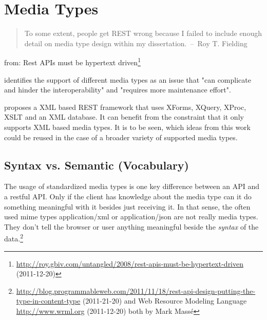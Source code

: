 \documentclass[12pt,a4paper]{scrartcl}		%
\newcommand{\citeurl}[2]{\url{#1} (#2)}
\begin{document}
\section{Media Types}


\begin{quote}
  To some extent, people get REST wrong because I failed to include enough
  detail on media type design within my dissertation.~--~Roy T. Fielding
\end{quote}
from: Rest APIs must be hypertext driven\footnote
  {\citeurl{http://roy.gbiv.com/untangled/2008/rest-apis-must-be-hypertext-driven}{2011-12-20}}

\cite[sec. 7.2]{Pautasso:2008:RWS:1367497.1367606} identifies the support of different media types as an issue that "can complicate and hinder the interoperability" and "requires more maintenance effort".

\cite{Davis:2011:XTR:1967428.1967437} proposes a XML based REST framework that uses XForms, XQuery, XProc, XSLT and an XML database. It can benefit from the constraint that it only supports XML based media types. It is to be seen, which ideas from this work could be reused in the case of a broader variety of supported media types.

\subsection{Syntax vs. Semantic (Vocabulary)}

The usage of standardized media types is one key difference between an API and a
restful API\cite[sec. 5.2.1.2]{Fielding2000}. Only if the client has knowledge
about the media type can it do something meaningful with it besides just
receiving it. In that sense, the often used mime types application/xml or
application/json are not really media types. They don't tell the browser or user
anything meaningful beside the \emph{syntax} of the data.\footnote{
\citeurl{http://blog.programmableweb.com/2011/11/18/rest-api-design-putting-the-type-in-content-type}{2011-21-20}
and Web Resource Modeling Language \citeurl{http://www.wrml.org}{2011-12-20} both by Mark Massé
}
\end{document}
